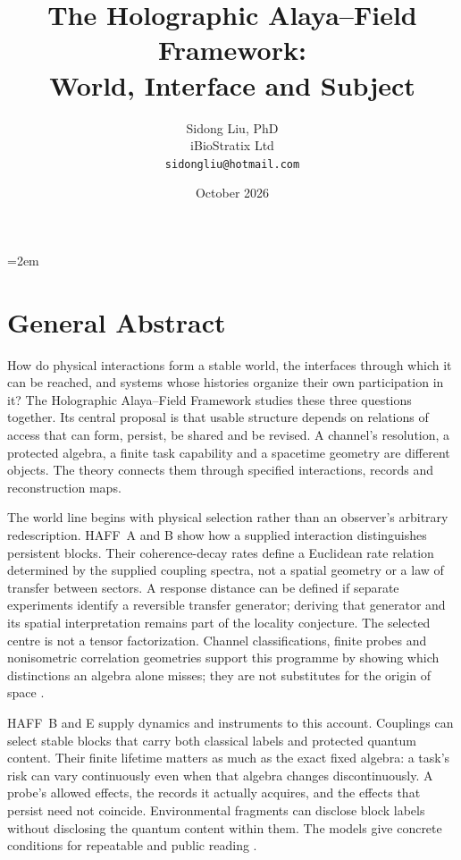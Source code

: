 \documentclass[12pt,a4paper]{article}
\title{The Holographic Alaya--Field Framework:\\
World, Interface and Subject}
\author{Sidong Liu, PhD\\iBioStratix Ltd\\\texttt{sidongliu@hotmail.com}}
\date{October 2026}
\begin{document}
\emergencystretch=2em
\raggedbottom
\maketitle

\section*{General Abstract}

How do physical interactions form a stable world, the interfaces through which it can be reached, and systems whose histories organize their own participation in it? The Holographic Alaya--Field Framework studies these three questions together. Its central proposal is that usable structure depends on relations of access that can form, persist, be shared and be revised. A channel's resolution, a protected algebra, a finite task capability and a spacetime geometry are different objects. The theory connects them through specified interactions, records and reconstruction maps.

The world line begins with physical selection rather than an observer's arbitrary redescription. HAFF~A and B show how a supplied interaction distinguishes persistent blocks. Their coherence-decay rates define a Euclidean rate relation determined by the supplied coupling spectra, not a spatial geometry or a law of transfer between sectors. A response distance can be defined if separate experiments identify a reversible transfer generator; deriving that generator and its spatial interpretation remains part of the locality conjecture. The selected centre is not a tensor factorization. Channel classifications, finite probes and nonisometric correlation geometries support this programme by showing which distinctions an algebra alone misses; they are not substitutes for the origin of space \cite{HAFFA,HAFFB}.

HAFF~B and E supply dynamics and instruments to this account. Couplings can select stable blocks that carry both classical labels and protected quantum content. Their finite lifetime matters as much as the exact fixed algebra: a task's risk can vary continuously even when that algebra changes discontinuously. A probe's allowed effects, the records it actually acquires, and the effects that persist need not coincide. Environmental fragments can disclose block labels without disclosing the quantum content within them. The models give concrete conditions for repeatable and public reading \cite{HAFFB,HAFFE}.
\end{document}
